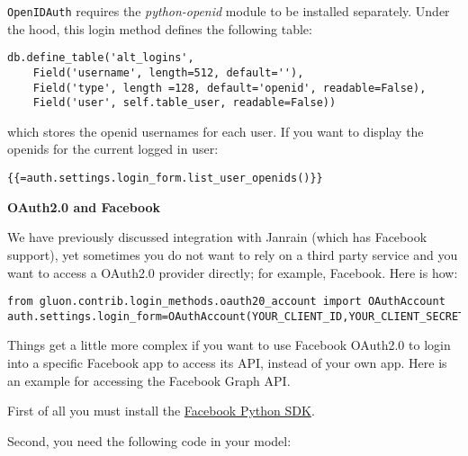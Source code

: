 \documentclass[justified,sixbynine,notoc]{tufte-book}
\def\ft{\small\tt}
\def\inxx#1{\index{#1}}
\begin{document}
\begin{fullwidth}
{\ft OpenIDAuth} requires the {\it python-openid} module to be installed separately. Under the hood, this login method defines the following table:

\begin{lstlisting}
db.define_table('alt_logins',
    Field('username', length=512, default=''),
    Field('type', length =128, default='openid', readable=False),
    Field('user', self.table_user, readable=False))
\end{lstlisting}
\noindent which stores the openid usernames for each user. If you want to display the openids for the current logged in user:

\begin{lstlisting}[keywords={}]
{{=auth.settings.login_form.list_user_openids()}}
\end{lstlisting}

{\bf OAuth2.0 and Facebook}

\inxx{OAuth} \inxx{Facebook}

We have previously discussed integration with Janrain (which has Facebook support), yet sometimes you do not want to rely on a third party service and you want to access a OAuth2.0 provider directly; for example, Facebook. Here is how:

\begin{lstlisting}
from gluon.contrib.login_methods.oauth20_account import OAuthAccount
auth.settings.login_form=OAuthAccount(YOUR_CLIENT_ID,YOUR_CLIENT_SECRET)
\end{lstlisting}

Things get a little more complex if you want to use Facebook OAuth2.0 to login into a specific Facebook app to access its API, instead of your own app. Here is an example for accessing the Facebook Graph API.

First of all you must install the {\footnotesize\href{https://github.com/pythonforfacebook/facebook-sdk/}{Facebook Python SDK}}.

Second, you need the following code in your model:


\end{fullwidth}
\end{document}
